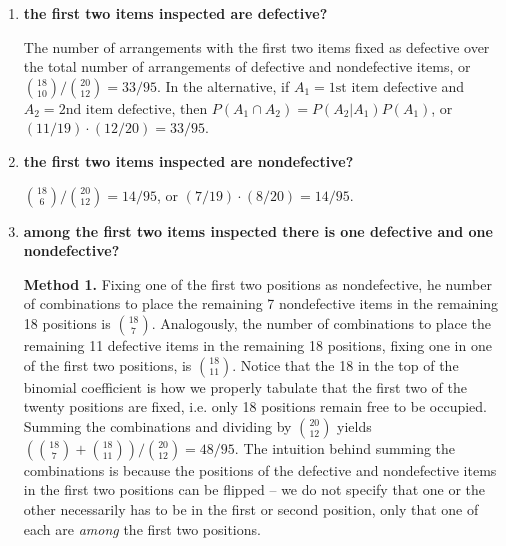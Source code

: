 \documentclass[10pt, oneside]{article}   	%
\theoremstyle{definition}
\begin{document}
\begin{enumerate}[label=3.\arabic*]
	\begin{enumerate}

	\item  \begin{tcolorbox}[
	  colback=Cerulean!5!white,
	  colframe=Cerulean!75!black]
	\textbf{the first two items inspected are defective?}
	\end{tcolorbox}
	
	The number of arrangements with the first two items fixed as defective over the total number of arrangements of defective and nondefective items, or $\binom{18}{10} / \binom{20}{12} = \boxed{33/95}$. In the alternative, if $A_1 = \text{1st item defective}$ and $A_2 = \text{2nd item defective}$, then $P(A_1 \cap A_2) = P(A_2 | A_1) P(A_1)$, or $(11/19) \cdot (12/20) = \boxed{33/95}$.
	
	\item  \begin{tcolorbox}[
	  colback=Cerulean!5!white,
	  colframe=Cerulean!75!black]
	\textbf{the first two items inspected are nondefective?}
	\end{tcolorbox}
	
	$\binom{18}{6} / \binom{20}{12} = \boxed{14/95}$, or $(7/19) \cdot (8/20) = \boxed{14/95}$.
	
	\item  \begin{tcolorbox}[
	  colback=Cerulean!5!white,
	  colframe=Cerulean!75!black]
	\textbf{among the first two items inspected there is one defective and one nondefective?}
	\end{tcolorbox}
	
	\textbf{Method 1.} Fixing one of the first two positions as nondefective, he number of combinations to place the remaining 7 nondefective items in the remaining 18 positions is $\binom{18}{7}$. Analogously, the number of combinations to place the remaining 11 defective items in the remaining 18 positions, fixing one in one of the first two positions, is $\binom{18}{11}$. Notice that the 18 in the top of the binomial coefficient is how we properly tabulate that the first two of the twenty positions are fixed, i.e. only 18 positions remain free to be occupied. Summing the combinations and dividing by $\binom{20}{12}$ yields $( \binom{18}{7} + \binom{18}{11} ) / \binom{20}{12} = \boxed{48/95}$. The intuition behind summing the combinations is because the positions of the defective and nondefective items in the first two positions can be flipped -- we do not specify that one or the other necessarily has to be in the first or second position, only that one of each are \textit{among} the first two positions. 
	

\end{enumerate}
\end{enumerate}
\end{document}
